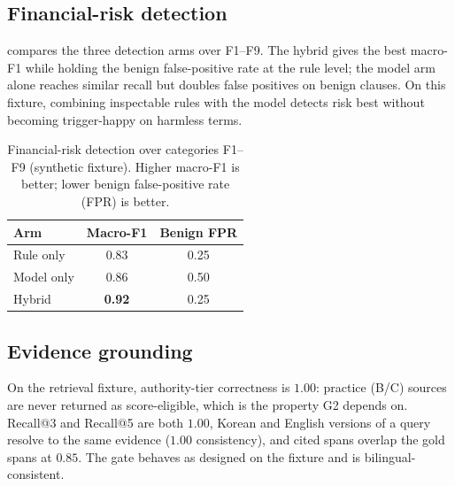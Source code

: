 \documentclass{article}
\theoremstyle{plain}
\begin{document}
\subsection{Financial-risk detection}
 compares the three detection arms over F1--F9. The hybrid gives
the best macro-F1 while holding the benign false-positive rate at the rule level;
the model arm alone reaches similar recall but doubles false positives on benign
clauses. On this fixture, combining inspectable rules with the model detects risk
best without becoming trigger-happy on harmless terms.

\begin{table}[t]
  \centering
  \caption{Financial-risk detection over categories F1--F9 (synthetic fixture).
  Higher macro-F1 is better; lower benign false-positive rate (FPR) is better.}
  \label{tab:detect}
  \begin{tabular}{lcc}
    \toprule
    Arm        & Macro-F1 & Benign FPR \\
    \midrule
    Rule only  & 0.83 & 0.25 \\
    Model only & 0.86 & 0.50 \\
    Hybrid     & \textbf{0.92} & 0.25 \\
    \bottomrule
  \end{tabular}
\end{table}

\subsection{Evidence grounding}
On the retrieval fixture, authority-tier correctness is $1.00$: practice (B/C)
sources are never returned as score-eligible, which is the property G2 depends on.
Recall@3 and Recall@5 are both $1.00$, Korean and English versions of a query
resolve to the same evidence ($1.00$ consistency), and cited spans overlap the
gold spans at $0.85$. The gate behaves as designed on the fixture and is
bilingual-consistent.
\end{document}
